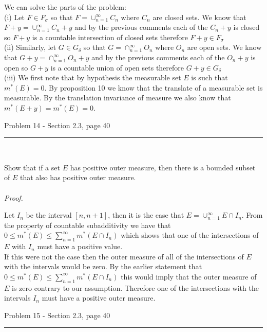\documentclass[11pt,reqno]{article}
\begin{document}
\noindent We can solve the parts of the problem:\\

\noindent (i) Let $F \in F_\sigma$ so that $F = \cup^\infty_{n = 1} C_n$ where $C_n$ are closed sets. We know that $F + y = \cup^\infty_{n = 1} C_n + y$ and by the previous comments each of the $C_n + y$ is closed so $F + y$ is a countable intersection of closed sets therefore $F + y \in F_\sigma$\\

\noindent (ii) Similarly, let $G \in G_\delta$ so that $G = \cap^\infty_{n = 1} O_n$ where $O_n$ are open sets. We know that $G + y = \cap^\infty_{n = 1} O_n + y$ and by the previous comments each of the $O_n + y$ is open so $G + y$ is a countable union of open sets therefore $G + y \in G_\delta$\\

\noindent (iii) We first note that by hypothesis the measurable set $E$ is such that $m^*(E) = 0$. By proposition 10 we know that the translate of a measurable set is measurable. By the translation invariance of measure we also know that $m^*(E  +y) = m^*(E) = 0$.

\begin{flushleft} 
Problem 14 - Section 2.3, page 40\\
\rule{500pt}{1pt}\\
\end{flushleft} 

Show that if a set $E$ has positive outer measure, then there is a bounded subset of $E$ that also has positive outer measure.
\\\\ \emph{Proof.}
 
Let $I_n$ be the interval $[n, n + 1] $,  then it is the case that $E = \cup_{n = 1} ^\infty  E\cap I_n $.  From the property of countable subadditivity we have that $0 \le m^*(E) \le \sum_{n  = 1}^\infty m^*(E\cap I_n)$ which shows that one of the intersections of $E$ with $I_n$ must have a positive value. \\
\indent If this were not the case then the outer measure of all of the intersections of $E$ with the intervals would be zero. By the earlier statement that $0 \le m^*(E) \le \sum_{n  = 1}^\infty m^*(E\cap I_n)$ this would imply that the outer measure of $E$ is zero contrary to our assumption. Therefore one of the intersections with the intervals $I_n$ must have a positive outer measure.

\begin{flushleft} 
Problem 15 - Section 2.3, page 40\\
\rule{500pt}{1pt}\\
\end{flushleft} 
\end{document}

